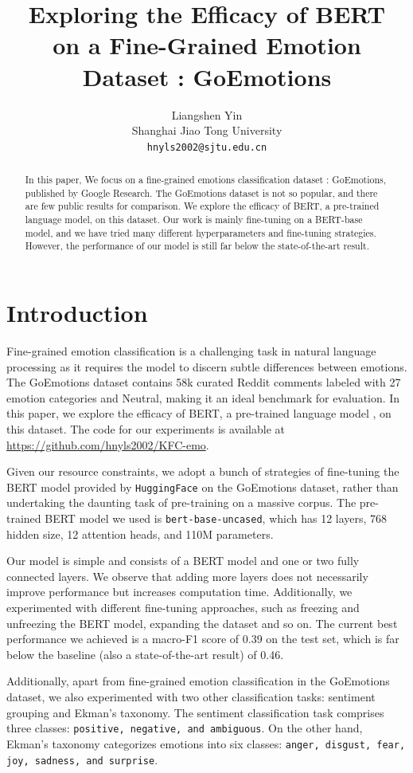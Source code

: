 \documentclass{article}
\title{Exploring the Efficacy of BERT \\ on a Fine-Grained Emotion Dataset : GoEmotions}
\author{
  \vspace{0.2cm}
  Liangshen Yin \\
  \vspace{0.2cm}
  Shanghai Jiao Tong University \\
  \texttt{hnyls2002@sjtu.edu.cn}
}
\begin{document}
\maketitle

\begin{abstract}
  In this paper, We focus on a fine-grained emotions classification dataset : GoEmotions, published by Google Research. The GoEmotions dataset is not so popular, and there are few public results for comparison. We explore the efficacy of BERT, a pre-trained language model, on this dataset.
  Our work is mainly fine-tuning on a BERT-base model, and we have tried many different hyperparameters and fine-tuning strategies. However, the performance of our model is still far below the state-of-the-art result.
\end{abstract}

\section{Introduction}
Fine-grained emotion classification is a challenging task in natural language processing as it requires the model to discern subtle differences between emotions. The GoEmotions dataset \cite{goemotions} contains 58k curated Reddit comments labeled with 27 emotion categories and Neutral, making it an ideal benchmark for evaluation. In this paper, we explore the efficacy of BERT, a pre-trained language model \cite{bert}, on this dataset. The code for our experiments is available at \url{https://github.com/hnyls2002/KFC-emo}.

Given our resource constraints, we adopt a bunch of strategies of fine-tuning the BERT model provided by \texttt{HuggingFace} on the GoEmotions dataset, rather than undertaking the daunting task of pre-training on a massive corpus. The pre-trained BERT model we used is \texttt{bert-base-uncased}, which has 12 layers, 768 hidden size, 12 attention heads, and 110M parameters.

Our model is simple and consists of a BERT model and one or two fully connected layers. We observe that adding more layers does not necessarily improve performance but increases computation time. Additionally, we experimented with different fine-tuning approaches, such as freezing and unfreezing the BERT model, expanding the dataset and so on. The current best performance we achieved is a macro-F1 score of 0.39 on the test set, which is far below the baseline (also a state-of-the-art result) of 0.46.

Additionally, apart from fine-grained emotion classification in the GoEmotions dataset, we also experimented with two other classification tasks: sentiment grouping and Ekman's taxonomy. The sentiment classification task comprises three classes: \texttt{positive, negative, and ambiguous}. On the other hand, Ekman's taxonomy categorizes emotions into six classes: \texttt{anger, disgust, fear, joy, sadness, and surprise}.
\end{document}
